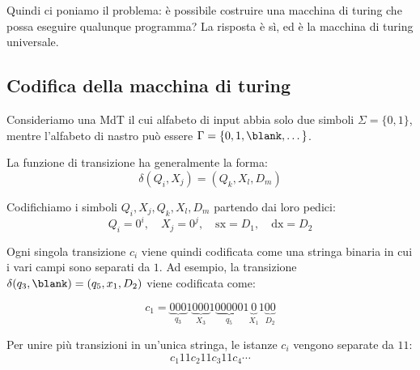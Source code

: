 Quindi ci poniamo il problema: è possibile costruire una macchina di turing che possa eseguire qualunque programma? La risposta è sì, ed è la macchina di turing universale.

\subsection{Codifica della macchina di turing}

Consideriamo una MdT il cui alfabeto di input abbia solo due simboli $ \Sigma = \{0, 1\} $, mentre l'alfabeto di nastro può essere $ \Gamma = \{0, 1, \blank, \dots\} $.

La funzione di transizione ha generalmente la forma:
\[
  \delta(Q_i, X_j) = (Q_k, X_l, D_m)
\]

\ex{}{
  \[
    \delta(q_3, \blank) = (q_5, 0, \to)
  \]
}

Codifichiamo i simboli $ Q_i, X_j, Q_k, X_l, D_m $ partendo dai loro pedici:
\[
  Q_i = 0^i, \quad X_j = 0^j, \quad \text{sx} = D_1, \quad \text{dx} = D_2
\]


Ogni singola transizione $ c_i $ viene quindi codificata come una stringa binaria in cui i vari campi sono separati da $ 1 $. Ad esempio, la transizione $ \delta(q_3, \blank) = (q_5, x_1, D_2) $ viene codificata come:

\[
  c_1 = \underbrace{000}_{q_3} 1 \underbrace{000}_{X_3} 1 \underbrace{00000}_{q_5} 1 \underbrace{0}_{X_1} 1 \underbrace{00}_{D_2}
\]

Per unire più transizioni in un'unica stringa, le istanze $ c_i $ vengono separate da $ 11 $:
\[
  c_1 11 c_2 11 c_3 11 c_4 \cdots
\]



